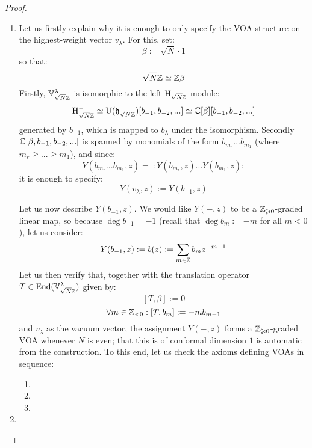                 \begin{proof}
                    \begin{enumerate}
                        \item Let us firstly explain why it is enough to only specify the VOA structure on the highest-weight vector $v_{\lambda}$. For this, set:
                            $$\beta := \sqrt{N} \cdot 1$$
                        so that:
                            $$\sqrt{N} \mathbb{Z} \simeq \mathbb{Z} \beta$$
                        Firstly, $\mathbb{V}_{\sqrt{N} \mathbb{Z}}^{\lambda}$ is isomorphic to the left-$\mathrm{H}_{\sqrt{N} \mathbb{Z}}$-module:
                            $$\mathrm{H}_{\sqrt{N} \mathbb{Z}}^- \simeq \mathrm{U}(\mathfrak{h}_{\sqrt{N} \mathbb{Z}})[b_{-1}, b_{-2}, ...] \simeq \mathbb{C}[\beta][b_{-1}, b_{-2}, ...]$$
                        generated by $b_{-1}$, which is mapped to $b_{\lambda}$ under the isomorphism. Secondly $\mathbb{C}[\beta, b_{-1}, b_{-2}, ...]$ is spanned by monomials of the form $b_{m_r} ... b_{m_1}$ (where $m_r \geq ... \geq m_1$), and since:
                            $$Y(b_{m_r} ... b_{m_1}, z) = \: : Y(b_{m_r}, z) ... Y(b_{m_1}, z) :$$
                        it is enough to specify:
                            $$Y(v_{\lambda}, z) := Y(b_{-1}, z)$$

                        Let us now describe $Y(b_{-1}, z)$. We would like $Y(-, z)$ to be a $\mathbb{Z}_{\geqslant 0}$-graded linear map, so because $\deg b_{-1} = -1$ (recall that $\deg b_m := -m$ for all $m < 0$), let us consider:
                            $$Y(b_{-1}, z) := b(z) := \sum_{m \in \mathbb{Z}} b_m z^{-m - 1}$$
                        Let us then verify that, together with the translation operator $T \in \mathrm{End}(\mathbb{V}_{\sqrt{N}\mathbb{Z}}^{\lambda})$ given by:
                            $$[T, \beta] := 0$$
                            $$\forall m \in \mathbb{Z}_{< 0}: [T, b_m] := -m b_{m - 1}$$
                        and $v_{\lambda}$ as the vacuum vector, the assignment $Y(-, z)$ forms a $\mathbb{Z}_{\geqslant 0}$-graded VOA whenever $N$ is even; that this is of conformal dimension $1$ is automatic from the construction. To this end, let us check the axioms defining VOAs in sequence:
                        \begin{enumerate}
                            \item 
                            \item 
                            \item 
                        \end{enumerate}
                        \item 
                    \end{enumerate}
                \end{proof}
                
